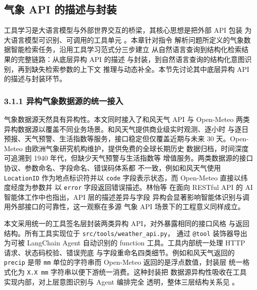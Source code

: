 ﻿%

\subsection{气象 API 的描述与封装}
\label{sec:api-tooling}

工具学习是大语言模型与外部世界交互的桥梁，其核心思想是把外部 API 包装
为大语言模型可识别、可调用的工具单元 \cite{ref21}。本章针对指令
解析问题所定义的气象数据智能检索任务，沿用工具学习范式分三步建立
从自然语言查询到结构化检索结果的完整链路：从底层异构 API 的描述
与封装，到自然语言查询的结构化意图识别，再到缺失检索参数的上下文
推理与动态补全。本节先讨论其中底层异构 API 的描述与封装环节。

\subsubsection*{3.1.1 \quad 异构气象数据源的统一接入}

气象数据源天然具有异构性。本文同时接入了和风天气 API 与 Open-Meteo
两类异构数据源以覆盖不同业务场景。和风天气提供商业级实时观测、逐小时
与逐日预报、天气预警、生活指数等服务，接口稳定但仅覆盖近期与未来
30 天。Open-Meteo 由欧洲气象研究机构维护，提供免费的全球长期历史
数据归档，时间深度可追溯到 1940 年代，但缺少天气预警与生活指数等
增值服务。两类数据源的接口协议、参数命名、字段命名、错误码体系都
不一致，例如和风天气使用 \texttt{LocationID} 作为地点标识符并以
\texttt{code} 字段表示状态，而 Open-Meteo 直接以纬度经度为参数并
以 \texttt{error} 字段返回错误描述。林怡等 \cite{ref3} 在面向
RESTful API 的 AI 智能体工作中也指出，API 层的描述差异与字段
异构会显著影响智能体识别与调用外部接口的可靠性，这一观察在多源
气象 API 场景下的工程意义同样成立。

本文采用统一的工具签名层封装两类异构 API，对外暴露相同的接口风格
与返回结构。所有工具实现位于 \texttt{src/\bk{}tools/\bk{}weather\_\bk{}api.\bk{}py}，
通过 \texttt{@tool} 装饰器导出为可被 LangChain Agent 自动识别的
function 工具。工具内部统一处理 HTTP 请求、状态码校验、错误兜底
与字段重命名四类细节。例如和风天气返回的 \texttt{precip} 是带
\texttt{mm} 单位的字符串而 Open-Meteo 返回的是浮点数值，封装层
统一格式化为 \texttt{X.\bk{}X mm} 字符串以便下游统一消费。这种封装把
数据源异构性吸收在工具实现内部，对上层意图识别与 Agent 编排完全
透明，整体三层结构关系见 。

